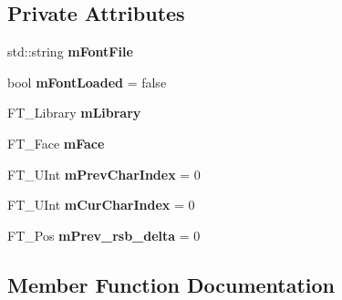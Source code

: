 \subsection*{Private Attributes}
\begin{DoxyCompactItemize}
\item 
\mbox{\label{classpepr3d_1_1_font_rasterizer_a2143778af8792270dc56c21d516f0a39}} 
std\+::string {\bfseries m\+Font\+File}
\item 
\mbox{\label{classpepr3d_1_1_font_rasterizer_a86bb6289a6c838b3988fb38b86fab014}} 
bool {\bfseries m\+Font\+Loaded} = false
\item 
\mbox{\label{classpepr3d_1_1_font_rasterizer_a61aa06d9f214a6298fc13be6f6821f6b}} 
F\+T\+\_\+\+Library {\bfseries m\+Library}
\item 
\mbox{\label{classpepr3d_1_1_font_rasterizer_a06267b2d5810dc38419f24792d922e79}} 
F\+T\+\_\+\+Face {\bfseries m\+Face}
\item 
\mbox{\label{classpepr3d_1_1_font_rasterizer_a157983c8ac203ec44d551db0f5d33075}} 
F\+T\+\_\+\+U\+Int {\bfseries m\+Prev\+Char\+Index} = 0
\item 
\mbox{\label{classpepr3d_1_1_font_rasterizer_a614fd5782aec36c0f5afd3c4f45b51ac}} 
F\+T\+\_\+\+U\+Int {\bfseries m\+Cur\+Char\+Index} = 0
\item 
\mbox{\label{classpepr3d_1_1_font_rasterizer_a1fc365e2226ad0555e7fc8e4fa25472d}} 
F\+T\+\_\+\+Pos {\bfseries m\+Prev\+\_\+rsb\+\_\+delta} = 0
\end{DoxyCompactItemize}


\subsection{Member Function Documentation}
\mbox{\label{classpepr3d_1_1_font_rasterizer_a478acb4e2249fe8f6d548e7c850196af}} 
